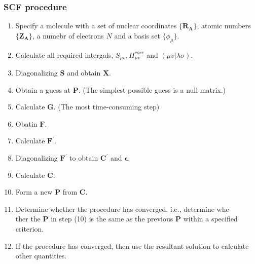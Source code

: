 \documentclass[11pt]{article}
\begin{document}
\subsubsection{SCF procedure}
\begin{enumerate}
    \item Specify a molecule with a set of nuclear coordinates $\{\mathbf{R_A}\}$, atomic numbers $\{\mathbf{Z_A}\}$, 
    a numebr of electrons $N$ and a basis set $\{\phi_{\mu}\}$.     
    \item Calculate  all required intergals, $S_{\mu v}, H_{\mu v}^{core}$ and $(\mu v|\lambda \sigma)$.
    \item Diagonalizing $\mathbf{S}$ and obtain $\mathbf{X}$.
    \item Obtain a guess at $\mathbf{P}$. (The simplest possible guess is a null matrix.)
    \item Calculate $\mathbf{G}$. (The most time-consuming step)
    \item Obatin $\mathbf{F}$.
    \item Calculate $\mathbf{F^{'}}$.
    \item Diagonalizing $\mathbf{F^{'}}$ to obtain $\mathbf{C^{'}}$ and $\mathbf{\epsilon}$.
    \item Calculate $\mathbf{C}$.
    \item Form a new $\mathbf{P}$ from $\mathbf{C}$.
    \item Determine whether the procedure has converged, i.e., determine whe-\\ther the $\mathbf{P}$ in step (10) is the same as the previous $\mathbf{P}$ within a specified criterion.
    \item If the procedure has converged, then use the resultant solution to calculate other quantities. 
\end{enumerate}
\end{document}
